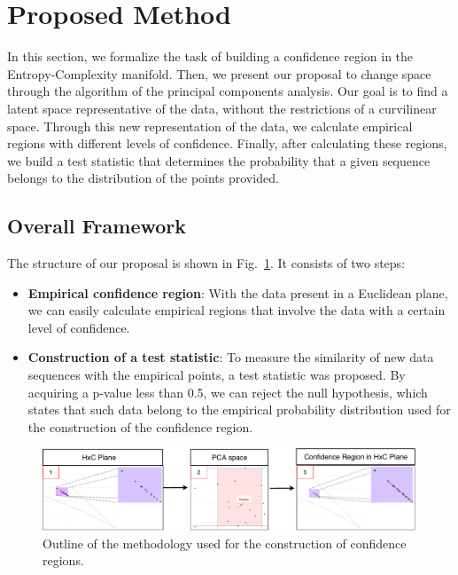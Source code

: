 \section{Proposed Method}

In this section, we formalize the task of building a confidence region in the Entropy-Complexity manifold.
Then, we present our proposal to change space through the algorithm of the principal components analysis.
Our goal is to find a latent space representative of the data, without the restrictions of a curvilinear space.
Through this new representation of the data, we calculate empirical regions with different levels of confidence.
Finally, after calculating these regions, we build a test statistic that determines the probability that a given sequence belongs to the distribution of the points provided.


\subsection{Overall Framework}

The structure of our proposal is shown in Fig.~\ref{fig:methodology}. 
It consists of two steps:
\begin{itemize}
    \item \textbf{Empirical confidence region}: With the data present in a Euclidean plane, we can easily calculate empirical regions that involve the data with a certain level of confidence.
    \item \textbf{Construction of a test statistic}: To measure the similarity of new data sequences with the empirical points, a test statistic was proposed. 
    By acquiring a p-value less than 0.5, we can reject the null hypothesis, which states that such data belong to the empirical probability distribution used for the construction of the confidence region.
\end{itemize}

\begin{figure}[H]
    \centering
    \includegraphics[width=\linewidth]{Figures/Methodology.pdf}
    \caption{Outline of the methodology used for the construction of confidence regions.}
    \label{fig:methodology}
\end{figure}


